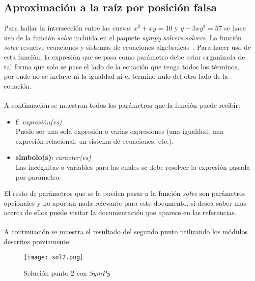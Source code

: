 \documentclass{article}
\begin{document}
\subsection{Aproximación a la raíz por posición falsa}
Para hallar la intersección entre las curvas \(x^2+xy=10\) y \(y+3xy^2=57\) se hace uso de la función \emph{solve} incluida en el paquete \emph{sympy.solvers.solvers}. La función \emph{solve} resuelve ecuaciones y sistemas de ecuaciones algebraicas~\cite{SymPy}. Para hacer uso de esta función, la expresión que se pasa como parámetro debe estar organizada de tal forma que solo se pase el lado de la ecuación que tenga todos los términos, por ende no se incluye ni la igualdad ni el termino nulo del otro lado de la ecuación.\\\\
A continuación se muestran todos los parámetros que la función puede recibir:
\begin{itemize}
    \item \textbf{f}: \emph{expresión(es)}\\
    Puede ser una sola expresión o varias expresiones (una igualdad, una expresión relacional, un sistema de ecuaciones, etc.).
    \item \textbf{símbolo(s)}: \emph{caracter(es)}\\
    Las incógnitas o variables para las cuales se debe resolver la expresión pasada por parámetro.
\end{itemize}
El resto de parámetros que se le pueden pasar a la función \emph{solve} son parámetros opcionales y no aportan nada relevante para este documento, si desea saber mas acerca de ellos puede visitar la documentación que aparece en las referencias.\\\\
A continuación se muestra el resultado del segundo punto utilizando los módulos descritos previamente:
\begin{figure}[H]
    \centering
    \texttt{[image: sol2.png]}
    \caption{Solución punto 2 con \emph{SymPy}}
    \label{fig:sol2}
\end{figure}
\printbibliography
\end{document}

